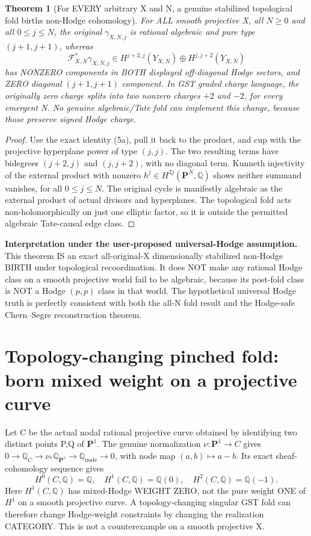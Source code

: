 \documentclass[11pt]{article}
\newcommand{\Q}{\mathbb Q}
\newtheorem{theorem}{Theorem}
\begin{document}
\begin{theorem}[For EVERY arbitrary X and N, a genuine stabilized topological fold births non-Hodge cohomology]
For ALL smooth
projective X,
all \(N\ge0\)
and all
\(0\le j\le N\),
the original
\(\gamma_{X,N,j}\)
is rational
algebraic and
pure type
\((j+1,j+1)\),
whereas
\[
 \boxed{
 \mathcal F_{X,N}^*\gamma_{X,N,j}
   \in H^{j+2,j}(Y_{X,N})
       \oplus H^{j,j+2}(Y_{X,N})
 }
                                                               \tag{5b}
\]
has NONZERO
components in
BOTH displayed
off-diagonal
Hodge sectors,
and ZERO
diagonal
\((j+1,j+1)\)
component.
In GST graded
charge language,
the originally
zero charge
splits into
two nonzero
charges \(+2\)
and \(-2\),
for every
emergent N.
No genuine
algebraic/Tate
fold can
implement
this change,
because those
preserve signed
Hodge charge.
\end{theorem}
\begin{proof}
Use the exact
identity (5a),
pull it back
to the product,
and cup with
the projective
hyperplane
power of type
\((j,j)\).
The two
resulting terms
have bidegrees
\((j+2,j)\)
and
\((j,j+2)\),
with no
diagonal
term.
Kunneth
injectivity
of the external
product with
nonzero
\(h^j\in
H^{2j}(\mathbf
P^N,\Q)\)
shows neither
summand
vanishes,
for all
\(0\le j\le N\).
The original
cycle is
manifestly
algebraic
as the
external product
of actual
divisors
and hyperplanes.
The topological
fold acts
non-holomorphically
on just
one elliptic
factor,
so it is
outside
the permitted
algebraic
Tate-causal
edge class.
\end{proof}

\noindent\textbf{Interpretation under the user-proposed universal-Hodge assumption.}
This theorem
IS an exact
all-original-X
dimensionally
stabilized
non-Hodge
BIRTH under
topological
recoordination.
It does NOT
make any
rational Hodge
class on a
smooth projective
world fail
to be algebraic,
because its
post-fold
class is
NOT a
Hodge
\((p,p)\) class
in that
world.
The
hypothetical
universal
Hodge truth
is perfectly
consistent
with both
the all-N
fold result
and
the Hodge-safe
Chern--Segre
reconstruction
theorem.

\section{Topology-changing pinched fold: born mixed weight on a projective curve}
Let C be the actual nodal rational projective curve
obtained by identifying two distinct points P,Q
of \(\mathbf P^1\). The genuine normalization
\(\nu:\mathbf P^1\to C\) gives
\(0\to\Q_C\to\nu_*\Q_{\mathbf P^1}
\to\Q_{\mathrm{node}}\to0\), with
node map \((a,b)\mapsto a-b\).
Its exact sheaf-cohomology sequence gives
\[
 \boxed{H^0(C,\Q)=\Q,\quad
 H^1(C,\Q)=\Q(0),\quad H^2(C,\Q)=\Q(-1).}          \tag{6}
\]
Here \(H^1(C,\Q)\) has mixed-Hodge WEIGHT ZERO,
not the pure weight ONE of \(H^1\) on a smooth
projective curve. A topology-changing singular
GST fold can therefore change Hodge-weight
constraints by changing the realization CATEGORY.
This is not a counterexample on a smooth projective X.
\end{document}
